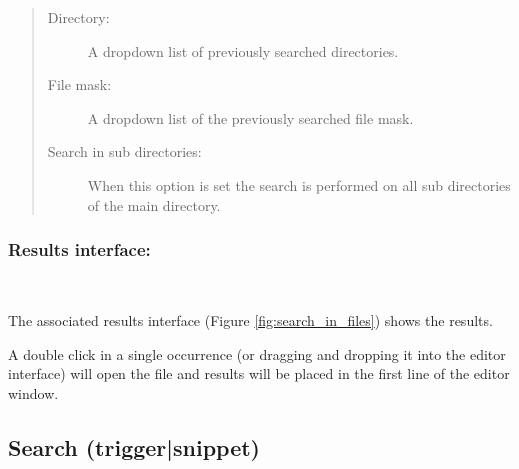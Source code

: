 \begin{quote}
  \begin{footnotesize}
    \begin{description}
      \item[Directory:]
        A dropdown list of previously searched directories.
      \item[File mask:]
        A dropdown list of the previously searched file mask.
      \item[Search in sub directories:]
        When this option is set the search is performed on all sub
        directories of the main directory.
    \end{description}
  \end{footnotesize}
\end{quote}

\subsubsection{Results interface:}\\

The associated results interface
(Figure \ref{fig:search_in_files})
shows the results.

A double click in a single occurrence (or dragging and dropping it into the
editor interface) will open the file and results will be placed in the first
line of the editor window.


\hypertarget{dlg_additional_dialogs_search_trigger}{}
\subsection{Search (trigger|snippet)}

